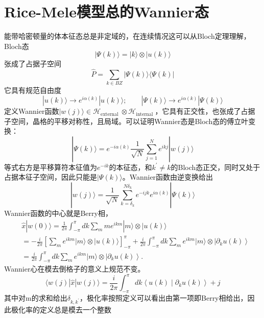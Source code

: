 \documentclass[12pt, a4paper, oneside]{ctexbook}
\begin{document}
\section{Rice-Mele模型总的Wannier态}
能带哈密顿量的体本征态总是非定域的，在连续情况这可以从Bloch定理理解，Bloch态
\begin{equation}
	|\Psi(k)\rangle=|k\rangle \otimes|u(k)\rangle
\end{equation}
张成了占据子空间
\begin{equation}
	\hat{P}=\sum_{k \in B Z}|\Psi(k)\rangle\langle\Psi(k)|
\end{equation}
它具有规范自由度
\begin{equation}
	|u(k)\rangle \rightarrow e^{i \alpha(k)}|u(k)\rangle ; \quad \quad|\Psi(k)\rangle \rightarrow e^{i \alpha(k)}|\Psi(k)\rangle
\end{equation}
定义Wannier函数$ |w(j)\rangle \in \mathscr{H}_{\text {external }} \otimes \mathscr{H}_{\text {internal }} $，它具有正交性，也张成了占据子空间，晶格的平移对称性，且局域。可以证明Wannier态是Bloch态的傅立叶变换：
\begin{equation}
	|\Psi(k)\rangle=e^{-i \alpha(k)} \frac{1}{\sqrt{N}} \sum_{j=1}^N e^{i k j}|w(j)\rangle
\end{equation} 
等式右方是平移算符本征值为$ e^{-i k} $的本征态，和$ k^{\prime} \neq k $的Bloch态正交，同时又处于占据本征子空间，因此只能是$ |\Psi(k)\rangle $。Wannier函数由逆变换给出
\begin{equation}
	|w(j)\rangle=\frac{1}{\sqrt{N}} \sum_{k=\delta_k}^{N \delta_k} e^{-i j k} e^{i \alpha(k)}|\Psi(k)\rangle
\end{equation}  
Wannier函数的中心就是Berry相，
\begin{equation}
	\begin{aligned}
		& \hat{x}|w(0)\rangle=\frac{1}{2 \pi} \int_{-\pi}^\pi d k \sum_m m e^{i k m}|m\rangle \otimes|u(k)\rangle \\
		&=-\frac{i}{2 \pi}\left[\sum_m e^{i k m}|m\rangle \otimes|u(k)\rangle\right]_{-\pi}^\pi+\frac{i}{2 \pi} \int_{-\pi}^\pi d k \sum_m e^{i k m}|m\rangle \otimes\left|\partial_k u(k)\right\rangle \\
		&=\frac{i}{2 \pi} \int_{-\pi}^\pi d k \sum_m e^{i k m}|m\rangle \otimes\left|\partial_k u(k)\right\rangle .
		\end{aligned}
\end{equation}
Wannier心在模去倒格子的意义上规范不变。
\begin{equation}
	\langle w(j)|\hat{x}| w(j)\rangle=\frac{i}{2 \pi} \int_{-\pi}^\pi d k\left\langle u(k) \mid \partial_k u(k)\right\rangle+j
\end{equation}
其中对m的求和给出$ \delta_{k,k^\prime} $，极化率按照定义可以看出由第一项即Berry相给出，因此极化率的定义总是模去一个整数 
\end{document}
